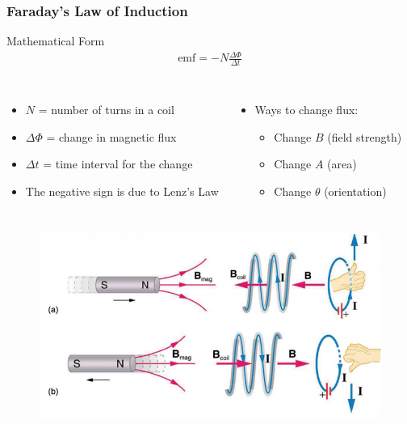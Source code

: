 \documentclass{beamer}
\begin{document}
\begin{frame}
\frametitle{Faraday's Law of Induction}
\begin{block}{Mathematical Form}
\begin{align}
\text{emf} = -N\frac{\Delta\Phi}{\Delta t}
\end{align}
\end{block}

\begin{columns}
\begin{itemize}
\item $N$ = number of turns in a coil
\item $\Delta\Phi$ = change in magnetic flux
\item $\Delta t$ = time interval for the change
\item The negative sign is due to Lenz's Law
\end{itemize}

\begin{itemize}
\item Ways to change flux:
\begin{itemize}
    \item Change $B$ (field strength)
    \item Change $A$ (area)
    \item Change $\theta$ (orientation)
\end{itemize}
\end{itemize}
\end{columns}
\end{frame}

\begin{frame}
\begin{figure}
    \centering
    \includegraphics[width=0.75\linewidth]{chflux.png}
\end{figure}
\end{frame}
\end{document}
